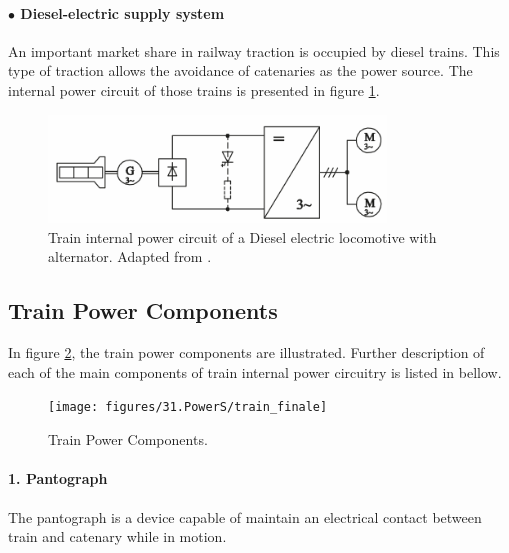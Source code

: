\paragraph{$\bullet$ Diesel-electric supply system\\}

An important market share in railway traction is occupied by diesel trains. This type of traction allows the avoidance of catenaries as the power source. The internal power circuit of those trains is presented in figure \ref{fig:steimel2008c}.

\begin{figure}[h!]
	\centering
	\begin{minipage}{.7\textwidth}
		\centering
		\includegraphics[width=0.8\textwidth,keepaspectratio]{figures/31.PowerS/steimel2008c}
		\caption{Train internal power circuit of a Diesel electric locomotive with alternator. Adapted from \cite{steimel2008}.}
		\label{fig:steimel2008c}
	\end{minipage}
\end{figure}

\newpage
\subsection{Train Power Components}
\label{subs:314}

In figure \ref{fig:train_finale}, the train power components are illustrated. Further description of each of the main components of train internal power circuitry is listed in bellow.


\begin{figure}[h!]
	\centering
	\texttt{[image: figures/31.PowerS/train\_finale]}
	\caption{Train Power Components.}
	\label{fig:train_finale}
\end{figure}

\paragraph{1. Pantograph\\}

	The pantograph is a device capable of maintain an electrical contact between train and catenary while in motion.
	
